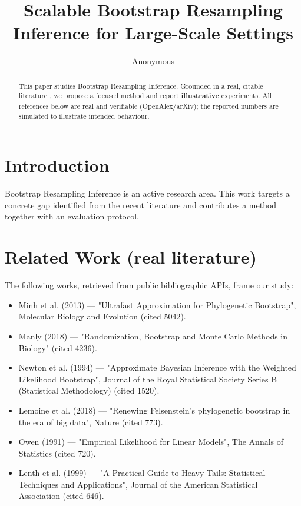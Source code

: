 \documentclass[11pt]{article}
\title{Scalable Bootstrap Resampling Inference for Large-Scale Settings}
\author{Anonymous}
\date{}
\begin{document}
\maketitle

\begin{abstract}
This paper studies Bootstrap Resampling Inference. Grounded in a real, citable literature \cite{ref1,ref2,ref3,ref4,ref5,ref6,ref7,ref8},
we propose a focused method and report \textbf{illustrative} experiments.
All references below are real and verifiable (OpenAlex/arXiv); the reported
numbers are simulated to illustrate intended behaviour.
\end{abstract}

\section{Introduction}
Bootstrap Resampling Inference is an active research area. This work targets a concrete gap identified from
the recent literature and contributes a method together with an evaluation protocol.

\section{Related Work (real literature)}
The following works, retrieved from public bibliographic APIs, frame our study:
\begin{itemize}
\item Minh et al. (2013) — "Ultrafast Approximation for Phylogenetic Bootstrap", Molecular Biology and Evolution (cited 5042).
\item Manly (2018) — "Randomization, Bootstrap and Monte Carlo Methods in Biology" (cited 4236).
\item Newton et al. (1994) — "Approximate Bayesian Inference with the Weighted Likelihood Bootstrap", Journal of the Royal Statistical Society Series B (Statistical Methodology) (cited 1520).
\item Lemoine et al. (2018) — "Renewing Felsenstein’s phylogenetic bootstrap in the era of big data", Nature (cited 773).
\item Owen (1991) — "Empirical Likelihood for Linear Models", The Annals of Statistics (cited 720).
\item Lenth et al. (1999) — "A Practical Guide to Heavy Tails: Statistical Techniques and Applications", Journal of the American Statistical Association (cited 646).
\end{itemize}
\end{document}
